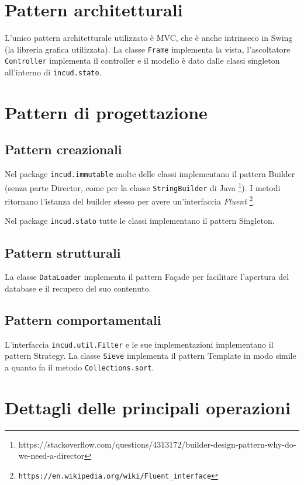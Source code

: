 \section{Pattern architetturali}

L'unico pattern architetturale utilizzato è MVC, che è anche intrinseco in Swing (la libreria grafica utilizzata). La classe \texttt{Frame} implementa la vista, l'ascoltatore \texttt{Controller} implementa il controller e il modello è dato dalle classi singleton all'interno di \texttt{incud.stato}.

\section{Pattern di progettazione}

\subsection{Pattern creazionali}

Nel package \texttt{incud.immutable} molte delle classi implementano il pattern Builder (senza parte Director, come per la classe \texttt{StringBuilder} di Java \footnote{https://stackoverflow.com/questions/4313172/builder-design-pattern-why-do-we-need-a-director}). I metodi ritornano l'istanza del builder stesso per avere un'interfaccia \emph{Fluent} \footnote{\texttt{https://en.wikipedia.org/wiki/Fluent\_interface}}.

Nel package \texttt{incud.stato} tutte le classi implementano il pattern Singleton.

\subsection{Pattern strutturali}

La classe \texttt{DataLoader} implementa il pattern Façade per facilitare l'apertura del database e il recupero del suo contenuto.

\subsection{Pattern comportamentali}

L'interfaccia \texttt{incud.util.Filter} e le sue implementazioni implementano il pattern Strategy. La classe \texttt{Sieve} implementa il pattern Template in modo simile a quanto fa il metodo \texttt{Collections.sort}.

\section{Dettagli delle principali operazioni}

